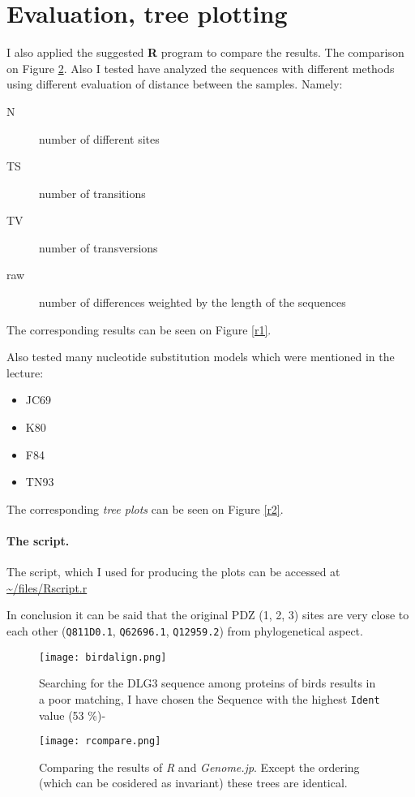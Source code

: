 \section{Evaluation, tree plotting}
I also applied the suggested \textbf{R} program to compare the results.
The comparison on Figure \ref{comapre1}.
Also I tested have analyzed the sequences with different methods using different evaluation of distance between the samples.
Namely:
\begin{description}
\item[N] number of different sites
\item[TS] number of transitions
\item[TV] number of transversions
\item[raw] number of differences weighted by the length of the sequences
\end{description}
The corresponding results can be seen on Figure \ref{r1}.

Also tested many nucleotide substitution models which were mentioned in the lecture:
\begin{itemize}
\item JC69 
\item K80 
\item F84 
\item TN93
\end{itemize}
The corresponding \emph{tree plots} can be seen on Figure \ref{r2}.

\paragraph{The script.} The script, which I used for producing the plots can be accessed at \url{~/files/Rscript.r}  

In conclusion it can be said that the original PDZ (1, 2, 3) sites are very close to each other (\texttt{Q811D0.1}, \texttt{Q62696.1}, \texttt{Q12959.2}) from phylogenetical aspect.



\begin{figure}
\centering
\texttt{[image: birdalign.png]}
\caption{Searching for the DLG3 sequence among proteins of birds results in a poor matching, I have chosen the Sequence with the highest \texttt{Ident} value (53 \%)-}
\label{bird}
\end{figure}

\begin{figure}
\centering
\texttt{[image: rcompare.png]}
\caption{Comparing the results of \emph{R} and \emph{Genome.jp}. Except the ordering (which can be cosidered as invariant) these trees are identical.}
\label{comapre1}
\end{figure}

